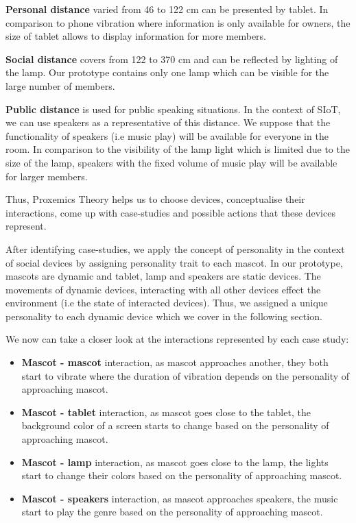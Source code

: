 \textbf{Personal distance} varied from 46 to 122 cm can be presented by tablet.
In comparison to phone vibration where information is only available for owners,
the size of tablet allows to display information for more members.

\textbf{Social distance} covers from 122 to 370 cm and can be reflected by lighting of the lamp.
Our prototype contains only one lamp which can be visible for the large number of members.

\textbf{Public distance} is used for public speaking situations.
In the context of SIoT, we can use speakers as a representative of this distance.
We suppose that the functionality of speakers (i.e music play) will be available for everyone in the room.
In comparison to the visibility of the lamp light which is limited due to the size of the lamp,
speakers with the fixed volume of music play will be available for larger members.

Thus, Proxemics Theory helps us to choose devices, conceptualise their interactions,
come up with case-studies and possible actions that these devices represent.

After identifying case-studies, we apply the concept of personality in the context of
social devices by assigning personality trait to each mascot.
In our prototype, mascots are dynamic and tablet, lamp and speakers are static devices.
The movements of dynamic devices, interacting with all other
devices effect the environment (i.e the state of interacted devices).
Thus, we assigned a unique personality to each dynamic device which we cover in the following section.

We now can take a closer look at the interactions represented by each case study:
\begin{itemize}
  \item \textbf{Mascot - mascot} interaction, as mascot approaches another,
        they both start to vibrate where the duration of vibration depends on the personality of approaching mascot.
  \item \textbf{Mascot - tablet} interaction, as mascot goes close to the tablet, the background
        color of a screen starts to change based on the personality of approaching mascot.
   \item \textbf{Mascot - lamp} interaction, as mascot goes close to the lamp,
        the lights start to change their colors based on the personality of approaching mascot.
   \item \textbf{Mascot - speakers} interaction, as mascot approaches speakers,
        the music start to play the genre based on the personality of approaching mascot.
\end{itemize}

